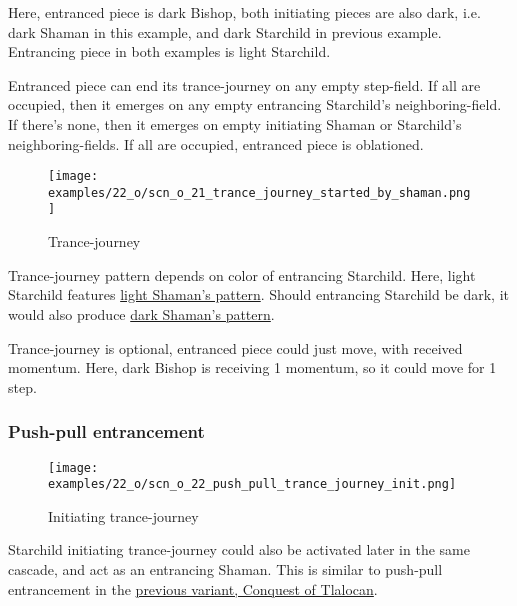Here, entranced piece is dark Bishop, both initiating pieces are also dark, i.e. dark Shaman
in this example, and dark Starchild in previous example. Entrancing piece in both examples
is light Starchild.

Entranced piece can end its trance-journey on any empty step-field. If all are occupied, then it emerges
on any empty entrancing Starchild's neighboring-field. If there's none, then it emerges on empty initiating
Shaman or Starchild's neighboring-fields. If all are occupied, entranced piece is oblationed.

\clearpage %

\vspace*{-2.1\baselineskip}
\noindent
\begin{figure}[!h]
\texttt{[image: examples/22\_o/scn\_o\_21\_trance\_journey\_started\_by\_shaman.png]}
\caption{Trance-journey}
\label{fig:scn_o_21_trance_journey_started_by_shaman}
\end{figure}

Trance-journey pattern depends on color of entrancing Starchild. Here, light Starchild features
\hyperref[fig:scn_cot_14_light_shaman_trance_journey]{light Shaman's pattern}. Should entrancing
Starchild be dark, it would also produce
\hyperref[fig:scn_cot_16_dark_shaman_trance_journey]{dark Shaman's pattern}.

Trance-journey is optional, entranced piece could just move, with received momentum.
Here, dark Bishop is receiving 1 momentum, so it could move for 1 step.

\clearpage %

\subsubsection*{Push-pull entrancement}

\vspace*{-0.9\baselineskip}
\noindent
\begin{wrapfigure}[7]{l}{0.4\textwidth} %
\centering
\texttt{[image: examples/22\_o/scn\_o\_22\_push\_pull\_trance\_journey\_init.png]}
\caption{Initiating trance-journey}
\label{fig:scn_o_22_push_pull_trance_journey_init}
\end{wrapfigure}
Starchild initiating trance-journey could also be activated later in the same cascade, and act as an
entrancing Shaman. This is similar to push-pull entrancement in the
\hyperref[fig:star/scn_cot_33_push_pull_entrancement_start]{previous variant, Conquest of Tlalocan}.

